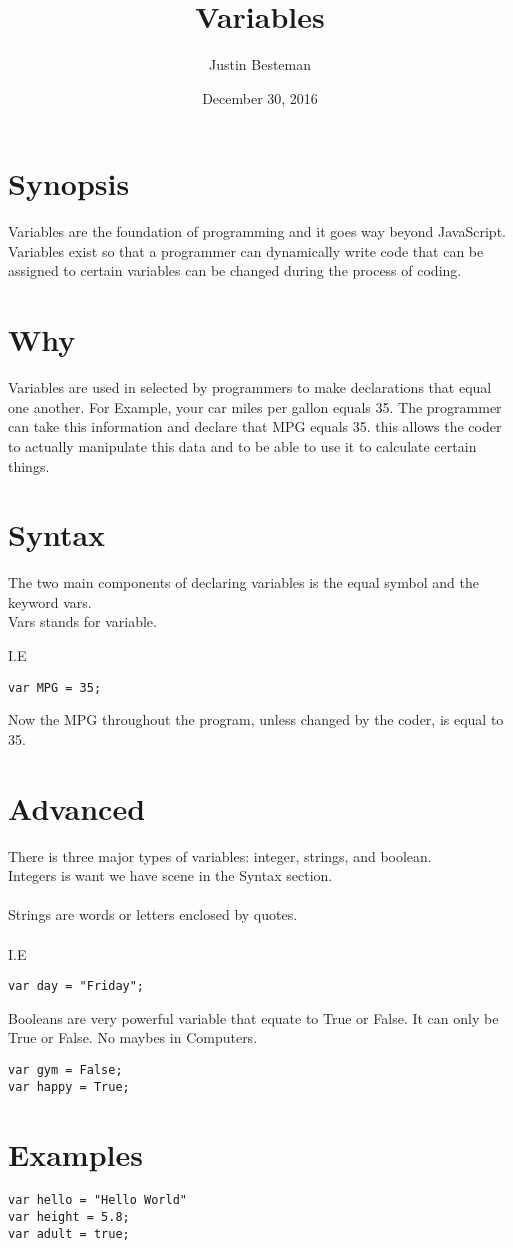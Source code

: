 \documentclass[12pt, letterpaper]{article}
\title{Variables}
\author{Justin Besteman}
\date{December 30, 2016}
\begin{document}
\maketitle


\section*{Synopsis}

	 Variables are the foundation of programming and it goes way beyond JavaScript. Variables exist so that a programmer can dynamically write code that can be assigned to certain variables can be changed during the process of coding. 

\section*{Why}

Variables are used in selected by programmers to make declarations that equal one another.  For Example, your car miles per gallon equals 35. The programmer can take this information and declare that MPG equals 35.  this allows the coder to actually manipulate this data and to be able to use it to calculate certain things. 

\section*{Syntax}

The two main components of declaring variables is the equal symbol and the keyword vars.\\
Vars stands for variable. 

I.E 

\begin{lstlisting}
var MPG = 35;
\end{lstlisting}
Now the MPG throughout the program, unless changed by the coder, is equal to 35.

\section*{Advanced}

There is three major types of variables: integer, strings, and boolean.\\
Integers is want we have scene in the Syntax section.\\ \\
Strings are words or letters enclosed by quotes.\\ \\
I.E \\
\begin{lstlisting}
var day = "Friday";
\end{lstlisting}
Booleans are very powerful variable that equate to True or False. It can only be True or False. No maybes in Computers.

\begin{lstlisting}
var gym = False;
var happy = True;
\end{lstlisting}


\section*{Examples}

\begin{lstlisting}
var hello = "Hello World"
var height = 5.8;
var adult = true;
\end{lstlisting}
\end{document}
